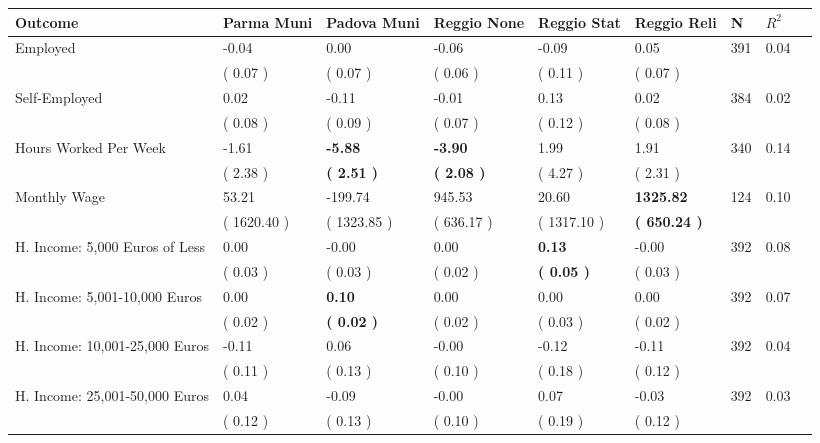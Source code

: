 \begin{tabular}{L{6.2cm} C{1.8cm} C{1.8cm} C{1.8cm} C{1.8cm} C{1.8cm} C{1.8cm} C{0.3cm} C{0.3cm}}
\toprule
 \textbf{Outcome} & \textbf{Parma Muni} & \textbf{Padova Muni} & \textbf{Reggio None} & \textbf{Reggio Stat} & \textbf{Reggio Reli} & \textbf{N} & \textbf{$ R^2$} \\
\midrule
Employed &     -0.04 &      0.00 &     -0.06 &     -0.09 &      0.05  & 391 &       0.04 \\ 
 & (     0.07 ) & (     0.07 ) & (     0.06 ) & (     0.11 ) & (     0.07 )  & \\
Self-Employed &      0.02 &     -0.11 &     -0.01 &      0.13 &      0.02  & 384 &       0.02 \\ 
 & (     0.08 ) & (     0.09 ) & (     0.07 ) & (     0.12 ) & (     0.08 )  & \\
Hours Worked Per Week &     -1.61 & \textbf{    -5.88} & \textbf{    -3.90} &      1.99 &      1.91  & 340 &       0.14 \\ 
 & (     2.38 ) & \textbf{(     2.51 )} & \textbf{(     2.08 )} & (     4.27 ) & (     2.31 )  & \\
Monthly Wage &     53.21 &   -199.74 &    945.53 &     20.60 & \textbf{  1325.82}  & 124 &       0.10 \\ 
 & (  1620.40 ) & (  1323.85 ) & (   636.17 ) & (  1317.10 ) & \textbf{(   650.24 )}  & \\
H. Income: 5,000 Euros of Less &      0.00 &     -0.00 &      0.00 & \textbf{     0.13} &     -0.00  & 392 &       0.08 \\ 
 & (     0.03 ) & (     0.03 ) & (     0.02 ) & \textbf{(     0.05 )} & (     0.03 )  & \\
H. Income: 5,001-10,000 Euros &      0.00 & \textbf{     0.10} &      0.00 &      0.00 &      0.00  & 392 &       0.07 \\ 
 & (     0.02 ) & \textbf{(     0.02 )} & (     0.02 ) & (     0.03 ) & (     0.02 )  & \\
H. Income: 10,001-25,000 Euros &     -0.11 &      0.06 &     -0.00 &     -0.12 &     -0.11  & 392 &       0.04 \\ 
 & (     0.11 ) & (     0.13 ) & (     0.10 ) & (     0.18 ) & (     0.12 )  & \\
H. Income: 25,001-50,000 Euros &      0.04 &     -0.09 &     -0.00 &      0.07 &     -0.03  & 392 &       0.03 \\ 
 & (     0.12 ) & (     0.13 ) & (     0.10 ) & (     0.19 ) & (     0.12 )  & \\

\end{tabular}
